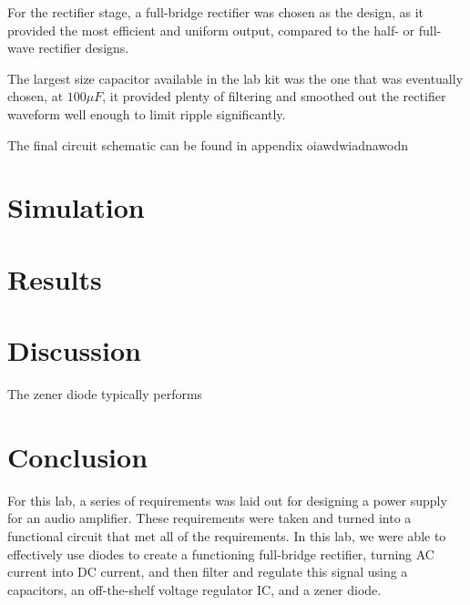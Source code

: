 \documentclass[12pt]{article}
\begin{document}
For the rectifier stage, a full-bridge rectifier was chosen as the design, as it provided
the most efficient and uniform output, compared to the half- or full-wave rectifier designs.

The largest size capacitor available in the lab kit was the one that was eventually chosen,
at $100 \mu F$, it provided plenty of filtering and smoothed out the rectifier waveform
well enough to limit ripple significantly.

The final circuit schematic can be found in appendix oiawdwiadnawodn

\section{Simulation}

\section{Results}


\section{Discussion}

The zener diode typically performs

\section{Conclusion}

For this lab, a series of requirements was laid out for designing a power supply for an audio
amplifier. These requirements were taken and turned into a functional circuit that met
all of the requirements. In this lab, we were able to effectively use diodes to create
a functioning full-bridge rectifier, turning AC current into DC current, and then filter
and regulate this signal using a capacitors, an off-the-shelf voltage regulator IC, and
a zener diode.
\end{document}
